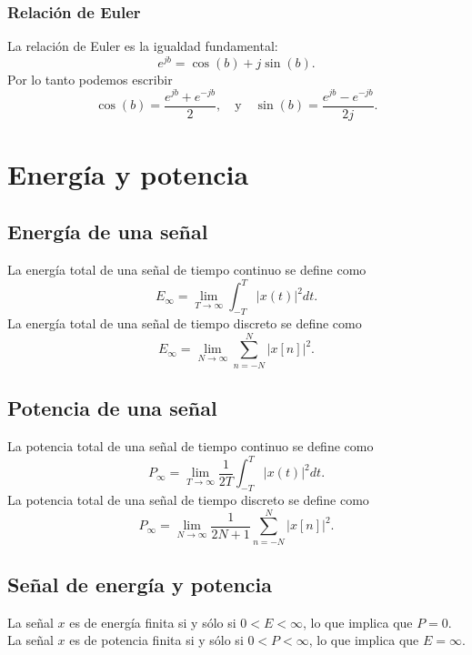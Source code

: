 \subsubsection{Relación de Euler}
La relación de Euler es la igualdad fundamental:
\begin{equation}
	e^{j b} =  \cos(b) + j \sin(b). \label{expeuler}
\end{equation}
Por lo tanto podemos escribir
\begin{equation}
	\cos(b) = \frac{e^{j b} + e^{-j b}}{2}, \quad \text{y} \quad \sin(b) = \frac{e^{j b} - e^{-j b}}{2j}. \label{coseuler}
\end{equation}

\section{Energía y potencia}

\subsection{Energía de una señal}
La energía total de una señal de tiempo continuo se define como
\begin{equation}
	E_{\infty } = \lim_{T \rightarrow \infty} \int_{-T}^{T} |x(t)|^2 dt.
\end{equation}
La energía total de una señal de tiempo discreto se define como
\begin{equation}
	E_{\infty } = \lim_{N \rightarrow \infty} \sum_{n=-N}^{N} |x[n]|^2.
\end{equation}

\subsection{Potencia de una señal}
La potencia total de una señal de tiempo continuo se define como
\begin{equation}
	P_{\infty } = \lim_{T \rightarrow \infty} \frac{1}{2T}\int_{-T}^{T} |x(t)|^2 dt.
\end{equation}
La potencia total de una señal de tiempo discreto se define como
\begin{equation}
	P_{\infty } = \lim_{N \rightarrow \infty} \frac{1}{2N+1}\sum_{n=-N}^{N} |x[n]|^2.
\end{equation}

\subsection{Señal de energía y potencia}
La señal $x$ es de energía finita si y sólo si $0 < E < \infty$, lo que implica que $P = 0$. La señal $x$ es de potencia finita si y sólo si $0 < P < \infty$, lo que implica que $E = \infty$.

